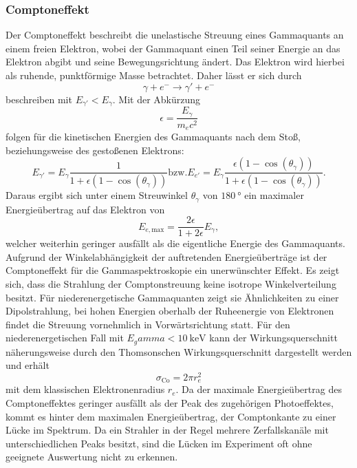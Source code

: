 \subsubsection{Comptoneffekt}
Der Comptoneffekt beschreibt die unelastische Streuung eines Gammaquants an einem freien Elektron, wobei der Gammaquant einen Teil seiner Energie an das Elektron abgibt und seine Bewegungsrichtung ändert. Das Elektron wird hierbei als ruhende, punktförmige Masse betrachtet. Daher lässt er sich durch
\begin{equation}
    \gamma + e^- \to \gamma' + e^-
\end{equation}
beschreiben mit $E_{\gamma'} < E_\gamma$.
Mit der Abkürzung
\begin{equation}
    \epsilon = \frac{E_\gamma}{m_e c^2}
\end{equation}
folgen für die kinetischen Energien des Gammaquants nach dem Stoß, beziehungsweise des gestoßenen Elektrons:
\begin{equation}
    E_{\gamma'} =  E_\gamma \frac{1}{1+ \epsilon (1-\cos(\theta_\gamma))} \text{bzw.} E_{e'} =  E_\gamma \frac{\epsilon (1-\cos(\theta_\gamma))}{1+ \epsilon (1-\cos(\theta_\gamma))} .
\end{equation}
Daraus ergibt sich unter einem Streuwinkel $\theta_\gamma$ von $\SI{180}{\degree}$ ein maximaler Energieübertrag auf das Elektron von
\begin{equation}
    E_{e,\text{max}} = \frac{2 \epsilon}{1 + 2 \epsilon} E_\gamma ,
\end{equation}
welcher weiterhin geringer ausfällt als die eigentliche Energie des Gammaquants. %
Aufgrund der Winkelabhängigkeit der auftretenden Energieüberträge ist der Comptoneffekt für die Gammaspektroskopie ein unerwünschter Effekt. Es zeigt sich, dass die Strahlung der Comptonstreuung keine isotrope Winkelverteilung besitzt. Für niederenergetische Gammaquanten zeigt sie Ähnlichkeiten zu einer Dipolstrahlung, bei hohen Energien oberhalb der Ruheenergie von Elektronen findet die Streuung vornehmlich in Vorwärtsrichtung statt. Für den niederenergetischen Fall mit $E_gamma < \SI{10}{\kilo\electronvolt}$ kann der Wirkungsquerschnitt näherungsweise durch den Thomsonschen Wirkungsquerschnitt dargestellt werden und erhält
\begin{equation}
    \sigma_\text{Co} = 2 \pi r_e^2
\end{equation}
mit dem klassischen Elektronenradius $r_e$. Da der maximale Energieübertrag des Comptoneffektes geringer ausfällt als der Peak des zugehörigen Photoeffektes, kommt es hinter dem maximalen Energieübertrag, der Comptonkante zu einer Lücke im Spektrum. Da ein Strahler in der Regel mehrere Zerfallskanäle mit unterschiedlichen Peaks besitzt, sind die Lücken im Experiment oft ohne geeignete Auswertung nicht zu erkennen.  
